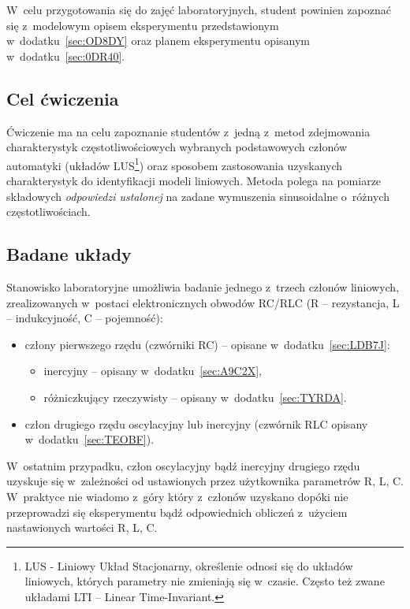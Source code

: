 \documentclass[paper=a4,DIV=12]{lpas}
\begin{document}
W~celu przygotowania się do zajęć laboratoryjnych, student powinien zapoznać
się z~modelowym opisem eksperymentu przedstawionym w~dodatku~\ref{sec:OD8DY}
oraz planem eksperymentu opisanym w~dodatku~\ref{sec:0DR40}.

\subsection{Cel ćwiczenia}
\label{sec:7HOCC}

Ćwiczenie ma na celu zapoznanie studentów z~jedną z~metod zdejmowania
charakterystyk częstotliwościowych wybranych podstawowych członów
automatyki (układów LUS\footnote{LUS - Liniowy Układ Stacjonarny, określenie
odnosi się do układów liniowych, których parametry nie zmieniają się w~czasie.
Często też zwane układami LTI -- Linear Time-Invariant.}) oraz sposobem
zastosowania uzyskanych charakterystyk do identyfikacji modeli liniowych.
Metoda polega na pomiarze składowych {\em odpowiedzi ustalonej} na zadane
wymuszenia sinusoidalne o~różnych częstotliwościach.


\subsection{Badane układy}
\label{sec:ITWYS}

Stanowisko laboratoryjne umożliwia badanie jednego z~trzech członów liniowych,
zrealizowanych w~postaci elektronicznych obwodów RC/RLC (R -- rezystancja,
L -- indukcyjność, C -- pojemność):
\begin{itemize}
  \item człony pierwszego rzędu (czwórniki RC) -- opisane w~dodatku~\ref{sec:LDB7J}:
    \begin{itemize}
      \item inercyjny -- opisany w~dodatku~\ref{sec:A9C2X},
      \item różniczkujący rzeczywisty -- opisany w~dodatku~\ref{sec:TYRDA}.
    \end{itemize}
  \item człon drugiego rzędu oscylacyjny lub inercyjny (czwórnik RLC opisany w~dodatku~\ref{sec:TEOBF}).
\end{itemize}
W~ostatnim przypadku, człon oscylacyjny bądź inercyjny drugiego rzędu uzyskuje
się w~zależności od ustawionych przez użytkownika parametrów R, L, C.
W~praktyce nie wiadomo z~góry który z~członów uzyskano dopóki nie przeprowadzi
się eksperymentu bądź odpowiednich obliczeń z~użyciem nastawionych wartości R,
L, C.
\end{document}
